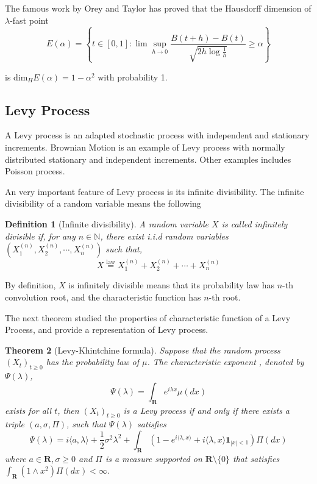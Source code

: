 \documentclass[11pt,english]{smfart}
\newcommand{\disteq}{\overset{\mathrm{law}}{=}}
\newtheorem{theorem}{Theorem}[subsection]
\newtheorem{definition}[theorem]{Definition}
\newcommand{\mb}{\mathbb}
\newcommand{\mf}{\mathbf}
\begin{document}
The famous work by Orey and Taylor \cite{Orey&Taylor} has proved that the Hausdorff dimension of $\lambda$-fast point 
$$E(\alpha) = \left\{t\in [0,1] : \lim \sup_{h\rightarrow 0} \frac{B(t+h) - B(t)}{\sqrt{2h\log \frac{1}{h}}} \geq \alpha\right\}$$

is $\text{dim}_{H} E(\alpha) = 1-\alpha^2$ with probability 1.


\subsection{Levy Process}
A Levy process is an adapted stochastic process with independent and stationary increments. Brownian Motion is an example of Levy process with normally distributed stationary and independent increments. Other examples includes Poisson process.

An very important feature of Levy process is its infinite divisibility. The infinite divisibility of a random variable means the following\\
\begin{definition}[Infinite divisibility]
    A random variable $X$ is called infinitely divisible if, for any $n\in \mb{N}$, there exist i.i.d random variables $\left(X_1^{(n)},X_2^{(n)},\cdots,X_n^{(n)}\right)$ such that, 
    $$X \disteq X_1^{(n)} + X_2^{(n)} +\cdots +X_n^{(n)} $$
\end{definition}

By definition, $X$ is infinitely divisible means that its probability law has $n$-th convolution root, and the characteristic function has $n$-th root.

The next theorem studied the properties of characteristic function of a Levy Process, and provide a representation of Levy process.\\
\begin{theorem}[Levy-Khintchine formula]
    Suppose that the random process $(X_t)_{t\geq 0}$ has the probability law of $\mu$. The characteristic exponent , denoted by $\Psi (\lambda)$, 
    $$\Psi(\lambda) = \int_{\mf{R}} e^{i\lambda x}\mu(dx)$$
    exists for all $t$,
    then $(X_t)_{t\geq 0}$ is a Levy process if and only if there exists a triple $(a,\sigma,\Pi)$, such that $\Psi(\lambda)$ satisfies
    $$\Psi(\lambda) = i\langle a,\lambda\rangle + \frac{1}{2}\sigma^2\lambda^2 + \int_{\mf{R}} (1-e^{i\langle \lambda, x \rangle} + i\langle \lambda,x \rangle \mf{1}_{|x|<1}) \Pi(dx) $$
    where $a \in \mf{R}, \sigma \geq 0$ and $\Pi$ is a measure supported on $\mf{R}\setminus\{0\}$ that satisfies $\int_{\mf{R}} (1\wedge x^2)\Pi(dx) < \infty$.
\end{theorem}
\end{document}
